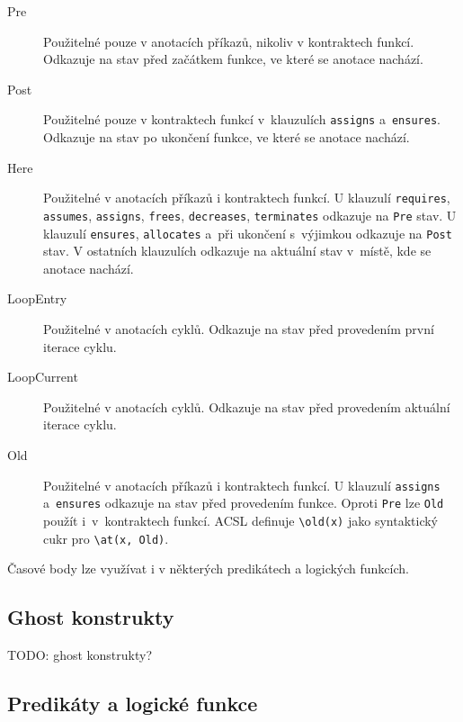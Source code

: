 \begin{description}
    \item[Pre]
    Použitelné pouze v anotacích příkazů, nikoliv v kontraktech funkcí.
    Odkazuje na stav před začátkem funkce, ve které se anotace nachází.

    \item[Post]
    Použitelné pouze v kontraktech funkcí v~klauzulích \texttt{assigns} a~\texttt{ensures}.
    Odkazuje na stav po ukončení funkce, ve které se anotace nachází.

    \item[Here]
    Použitelné v anotacích příkazů i kontraktech funkcí.
    U klauzulí \texttt{requires}, \texttt{assumes}, \texttt{assigns}, \texttt{frees}, \texttt{decreases}, \texttt{terminates} odkazuje na \texttt{Pre} stav.
    U klauzulí \texttt{ensures}, \texttt{allocates} a~při ukončení s~výjimkou odkazuje na \texttt{Post} stav.
    V ostatních klauzulích odkazuje na aktuální stav v~místě, kde se anotace nachází.

    \item[LoopEntry]
    Použitelné v anotacích cyklů.
    Odkazuje na stav před provedením první iterace cyklu.

    \item[LoopCurrent]
    Použitelné v anotacích cyklů.
    Odkazuje na stav před provedením aktuální iterace cyklu.

    \item[Old]
    Použitelné v anotacích příkazů i kontraktech funkcí.
    U klauzulí \texttt{assigns} a~\texttt{ensures} odkazuje na stav před provedením funkce.
    Oproti \texttt{Pre} lze \texttt{Old} použít i~v~kontraktech funkcí.
    ACSL definuje \texttt{\textbackslash old(x)} jako syntaktický cukr pro \texttt{\textbackslash at(x, Old)}.
\end{description}

Časové body lze využívat i v některých predikátech a logických funkcích.

\subsection{Ghost konstrukty}
\label{subsec:acsl-ghost-konstrukty}

TODO: ghost konstrukty?

\subsection{Predikáty a logické funkce}
\label{subsec:acsl-predikaty-a-logicke-funkce}

